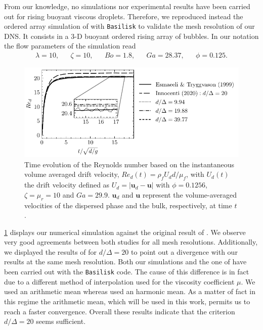 \documentclass[11pt]{My_preprint}
\begin{document}
From our knowledge, no simulations nor experimental results have been carried out for rising buoyant viscous droplets. 
Therefore, we reproduced instead the ordered array simulation of \citet{esmaeeli1999direct} with \texttt{Basilisk} to validate the mesh resolution of our DNS.  
It consists in a 3-D buoyant ordered rising array of bubbles. 
In our notation the flow parameters of the simulation read 
\begin{align*}
    \lambda = 10,
    && \zeta = 10,
    && Bo = 1.8,
    && Ga = 28.37,
    && \phi = 0.125.
\end{align*}
\begin{figure}[h!]
    \centering
    \includegraphics[height = 0.3\textwidth]{image/VALIDATION2.0/Loisy/Re.pdf}
    \caption{Time evolution of the Reynolds number based on the instantaneous volume averaged drift velocity, $Re_d(t) = \rho_fU _dd /\mu_f$, with $U_d(t)$ the drift velocity defined as $U_d = |\textbf{u}_d - \textbf{u}|$ with $\phi = 0.1256$, $\zeta =\mu_r =10$ and $Ga = 29.9$. $\textbf{u}_d$ and $\textbf{u}$ represent the volume-averaged velocities of the dispersed phase and the bulk, respectively, at time $t$.}
\label{fig:ordered_array}
\end{figure}
\ref{fig:ordered_array} displays our numerical simulation against the original result of \citet{esmaeeli1999direct}.
We observe very good agreements between both studies for all mesh resolutions.
Additionally, we displayed the results of \citet{innocenti2020direct} for $d/\Delta = 20$ to point out a divergence with our results at the same mesh resolution.  
Both our simulations and the one of \citet{innocenti2020direct} have been carried out with the  \texttt{Basilisk} code. 
The cause of this difference is in fact due to a different method of interpolation used for the viscosity coefficient $\mu$. 
We used an arithmetic mean whereas \citet{innocenti2020direct} used an 
harmonic mean.
As a matter of fact in this regime the arithmetic mean, which will be used in this work, permits us to reach a faster convergence. 
Overall these results indicate that the criterion $d/\Delta = 20$ seems sufficient.
\end{document}
